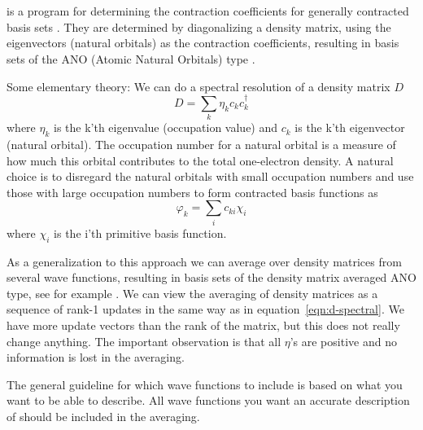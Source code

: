 
\section{}
\label{UG:sec:genano}
 is a program for
determining the contraction coefficients for
generally contracted basis sets \cite{Raffenetti:73}.
They are determined by diagonalizing a density matrix,
using the eigenvectors (natural orbitals) as
the contraction coefficients, resulting
in basis sets of the ANO (Atomic Natural Orbitals)
type \cite{Almlof:87}.

Some elementary theory: We can do a spectral resolution of a density matrix $D$
\begin{equation}
\label{eqn:d-spectral}
D=\sum_k \eta_k c_k c_k^{\dag}
\end{equation}
where $\eta_k$ is the k'th eigenvalue (occupation value)
and $c_k$ is the k'th eigenvector (natural orbital).
The occupation number for a natural orbital is a
measure of how much this orbital contributes to
the total one-electron density.
A natural choice is to disregard the natural orbitals
with small occupation numbers and use those with large
occupation numbers to form contracted basis functions as
\begin{equation}
\varphi_k=\sum_i c_{ki} \chi_i
\end{equation}
where $\chi_i$ is the i'th primitive basis function.

As a generalization to this approach we can
average over density
matrices from several wave functions, resulting
in basis sets of the density matrix averaged ANO type,
see for example \cite{anoI,anoII,anoIII,anoIV}.
We can view the averaging of density matrices as a sequence
of rank-1 updates in the same way as in equation~\ref{eqn:d-spectral}.
We have more update vectors than the rank of the matrix, but this
does not really change anything. The important observation is
that all $\eta$'s are positive and no information is lost
in the averaging.

The general guideline for which wave functions to include is
based on what you want to be able to describe.
All wave functions you want an accurate description of
should be included in the averaging.

